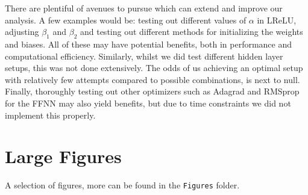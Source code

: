 \documentclass[%
reprint,s
amsmath,amssymb,
aps,
]{revtex4-2}
\begin{document}
There are plentiful of avenues to pursue which can extend and improve our analysis. A few examples would be: testing out different values of $\alpha$ in LReLU, adjusting $\beta_1$ and $\beta_2$ and testing out different methods for initializing the weights and biases. All of these may have potential benefits, both in performance and computational efficiency. Similarly, whilst we did test different hidden layer setups, this was not done extensively. The odds of us achieving an optimal setup with relatively few attempts compared to possible combinations, is next to null. Finally, thoroughly testing out other optimizers such as Adagrad and RMSprop for the FFNN may also yield benefits, but due to time constraints we did not implement this properly. 




\appendix
\section{Large Figures}
\label{Appendix:A}
A selection of figures, more can be found in the \texttt{Figures} folder.

\end{document}
